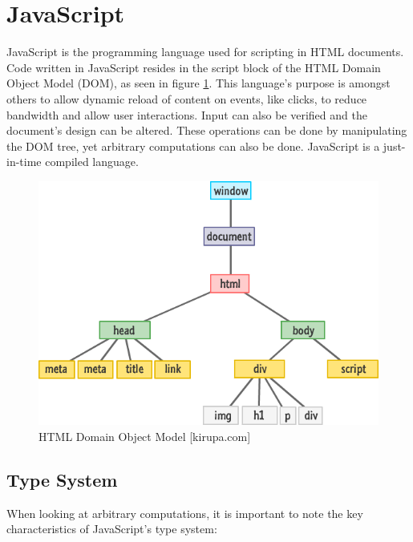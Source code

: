 \section{JavaScript} \label{chapter_javascript}

JavaScript is the programming language used for scripting in HTML documents. Code written in JavaScript resides in the script block of the HTML Domain Object Model (DOM), as seen in figure \ref{fig:htmldom}. This language's purpose is amongst others to allow dynamic reload of content on events, like clicks, to reduce bandwidth and allow user interactions. Input can also be verified and the document's design can be altered. These operations can be done by manipulating the DOM tree, yet arbitrary computations can also be done. JavaScript is a just-in-time compiled language.

\begin{figure}[htp]
  \begin{center}
    \includegraphics[width=0.9\columnwidth]{resources/html_dom.png}
  \end{center}
  \caption{HTML Domain Object Model [kirupa.com]}
  \label{fig:htmldom}
\end{figure}


\subsection{Type System}

When looking at arbitrary computations, it is important to note the key characteristics of JavaScript's type system:

